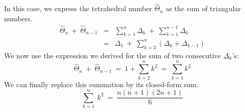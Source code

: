 \begin{itemize}
\begin{itemize}
In this case, we express the tetrahedral number $\widehat{\Theta}_n$ as the sum of triangular numbers.
\begin{eqnarray*}
\widehat{\Theta}_n \ + \ \widehat{\Theta} _{n-1} 
  & = & \sum_{k=1}^n \Delta_k \ + \ \sum_{k=1}^{n-1} \Delta_k \\
  & = & \Delta_1 \ + \ \sum_{k=2}^{n} \left( \Delta_k + \Delta_{k-1} \right)
\end{eqnarray*} 
We now use the expression we derived for the sum of two consecutive $\Delta_k$'s:
\[
\widehat{\Theta}_n \ + \ \widehat{\Theta} _{n-1} \ = \ 1 + \sum_{k=2}^{n} k^2 
\ = \ \sum_{k=1}^{n} k^2 
\]
We can finally replace this summation by its closed-form sum.
\[
\sum_{k=1}^{n} \ k^2 \ = \ \frac{n(n+1)(2n+1)}{6}
\]
  \end{itemize}
\end{itemize} 


